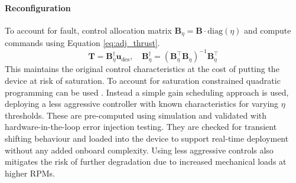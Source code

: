 \paragraph{Reconfiguration}
To account for fault, control allocation matrix $\mathbf{B}_\eta = \mathbf{B} \cdot \text{diag}(\eta)$ and compute commands using Equation \ref{eq:adj_thrust}.
\begin{equation}\label{eq:adj_thrust}
    \mathbf{T} = \mathbf{B}_\eta^\dagger \mathbf{u}_{\text{des}}, \quad \mathbf{B}_\eta^\dagger = (\mathbf{B}_\eta^\top \mathbf{B}_\eta)^{-1} \mathbf{B}_\eta^\top
\end{equation}
This maintains the original control characteristics at the cost of putting the device at risk of saturation. To account for saturation constrained quadratic programming can be used \cite{JOHANSEN2013}. Instead a simple gain scheduling approach is used, deploying a less aggressive controller with known characteristics for varying $\eta$ thresholds. These are pre-computed using simulation and validated with hardware-in-the-loop error injection testing. They are checked for transient shifting behaviour and loaded into the device to support real-time deployment without any added onboard complexity. Using less aggressive controls also mitigates the risk of further degradation due to increased mechanical loads at higher \gls{RPM}s.

